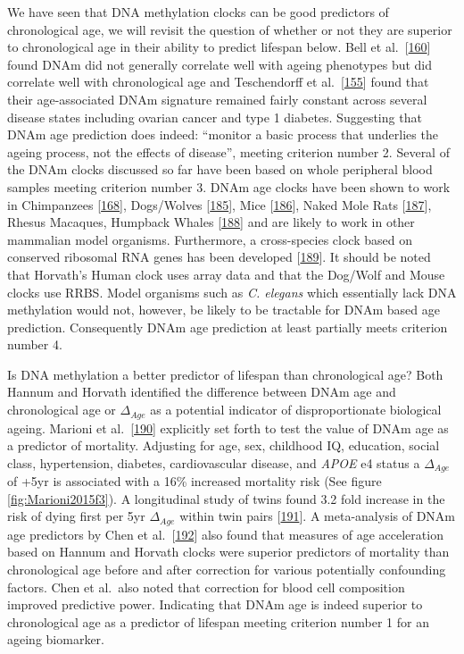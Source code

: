 \documentclass[
]{book}
\begin{document}
We have seen that DNA methylation clocks can be good predictors of chronological age, we will revisit the question of whether or not they are superior to chronological age in their ability to predict lifespan below.
Bell et al.~{[}\protect\hyperlink{ref-Bell2012}{160}{]} found DNAm did not generally correlate well with ageing phenotypes but did correlate well with chronological age and Teschendorff et al.~{[}\protect\hyperlink{ref-Teschendorff2010}{155}{]} found that their age-associated DNAm signature remained fairly constant across several disease states including ovarian cancer and type 1 diabetes.
Suggesting that DNAm age prediction does indeed: ``monitor a basic process that underlies the ageing process, not the effects of disease'', meeting criterion number 2.
Several of the DNAm clocks discussed so far have been based on whole peripheral blood samples meeting criterion number 3. DNAm age clocks have been shown to work in Chimpanzees {[}\protect\hyperlink{ref-Horvath2013}{168}{]}, Dogs/Wolves {[}\protect\hyperlink{ref-Thompson2017}{185}{]}, Mice {[}\protect\hyperlink{ref-Stubbs2017}{186}{]}, Naked Mole Rats {[}\protect\hyperlink{ref-Lowe2020}{187}{]}, Rhesus Macaques, Humpback Whales {[}\protect\hyperlink{ref-Lowe2018}{188}{]} and are likely to work in other mammalian model organisms.
Furthermore, a cross-species clock based on conserved ribosomal RNA genes has been developed {[}\protect\hyperlink{ref-Wang2019}{189}{]}.
It should be noted that Horvath's Human clock uses array data and that the Dog/Wolf and Mouse clocks use RRBS.
Model organisms such as \emph{C. elegans} which essentially lack DNA methylation would not, however, be likely to be tractable for DNAm based age prediction.
Consequently DNAm age prediction at least partially meets criterion number 4.

Is DNA methylation a better predictor of lifespan than chronological age?
Both Hannum and Horvath identified the difference between DNAm age and chronological age or \(\Delta_{Age}\) as a potential indicator of disproportionate biological ageing.
Marioni et al.~{[}\protect\hyperlink{ref-Marioni2015}{190}{]} explicitly set forth to test the value of DNAm age as a predictor of mortality.
Adjusting for age, sex, childhood IQ, education, social class, hypertension, diabetes, cardiovascular disease, and \emph{APOE} e4 status a \(\Delta_{Age}\) of +5yr is associated with a 16\% increased mortality risk (See figure \ref{fig:Marioni2015f3}).
A longitudinal study of twins found 3.2 fold increase in the risk of dying first per 5yr \(\Delta_{Age}\) within twin pairs {[}\protect\hyperlink{ref-Christiansen2016}{191}{]}.
A meta-analysis of DNAm age predictors by Chen et al.~{[}\protect\hyperlink{ref-Chen2016a}{192}{]} also found that measures of age acceleration based on Hannum and Horvath clocks were superior predictors of mortality than chronological age before and after correction for various potentially confounding factors.
Chen et al.~also noted that correction for blood cell composition improved predictive power.
Indicating that DNAm age is indeed superior to chronological age as a predictor of lifespan meeting criterion number 1 for an ageing biomarker.
\end{document}
